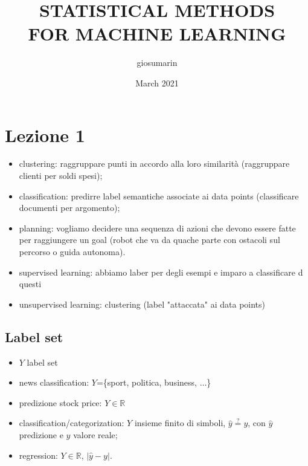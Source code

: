 \documentclass{article}
\title{STATISTICAL METHODS \\FOR MACHINE LEARNING}
\author{giosumarin}
\date{March 2021}
\begin{document}
\maketitle

\tableofcontents


\section{Lezione 1}
\begin{itemize}
	\item clustering: raggruppare punti in accordo alla loro similarità (raggruppare clienti per soldi spesi);
	\item classification: predirre label semantiche associate ai data points (classificare documenti per argomento);
	\item planning: vogliamo decidere una sequenza di azioni che devono essere fatte per raggiungere un goal (robot che va da quache parte con ostacoli sul percorso o guida autonoma).
	\item supervised learning: abbiamo laber per degli esempi e imparo a classificare d questi
	\item unsupervised learning: clustering (label "attaccata" ai data points)
\end{itemize}

\subsection{Label set}
\begin{itemize}
	\item $Y$ label set
	\item news classification: $Y$=\{sport, politica, business, $\dots$\}
	\item predizione stock price: $Y \in \mathbb{R}$
	\item classification/categorization: $Y$ insieme finito di simboli, $\hat{y} \overset{?}{=}y$, con $\hat{y}$ predizione e $y$ valore reale;
	\item regression: $Y \in \mathbb{R}$, $|\hat{y}-y|$.
\end{itemize}
\end{document}
